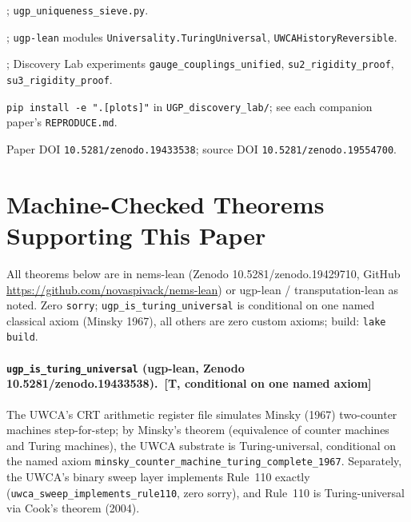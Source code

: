 \documentclass[12pt]{article}
\begin{document}
\begin{description}[leftmargin=0pt,itemsep=0.3em]
\item[\textit{AP-I (Uniqueness):}] \cite{SpivackUGPUniqueness}; \texttt{ugp\_uniqueness\_sieve.py}.
\item[\textit{AP-III (Reflexive Computation):}] \cite{SpivackUGPFormalization,ugp-lean}; \texttt{ugp-lean} modules \texttt{Universality.\allowbreak TuringUniversal}, \texttt{UWCAHistoryReversible}.
\item[\textit{AP-IV (Constants):}] \cite{Spivack2025_UGPMathFoundations}; Discovery Lab experiments \texttt{gauge\_couplings\_unified}, \texttt{su2\_rigidity\_proof}, \texttt{su3\_rigidity\_proof}.
\item[\textit{All experiments:}] \texttt{pip install -e ".[plots]"} in \texttt{UGP\_discovery\_lab/}; see each companion paper's \texttt{REPRODUCE.md}.
\item[\textit{ugp-lean:}] Paper DOI \texttt{10.5281/zenodo.19433538}; source DOI \texttt{10.5281/zenodo.19554700}.
\end{description}

\section{Machine-Checked Theorems Supporting This Paper}
\label{app:lean}

All theorems below are in nems-lean (Zenodo 10.5281/\allowbreak zenodo.19429710,
GitHub \url{https://github.com/novaspivack/nems-lean}) or ugp-lean / transputation-lean
as noted. Zero \texttt{sorry}; \texttt{ugp\_is\_turing\_universal} is conditional on one
named classical axiom (Minsky 1967), all others are zero custom axioms; build:
\texttt{lake build}.

\paragraph{\texttt{ugp\_is\_turing\_universal} (ugp-lean,
Zenodo 10.5281/\allowbreak zenodo.19433538).~[\textbf{T}, conditional on one named axiom]}
The UWCA's CRT arithmetic register file simulates Minsky (1967) two-counter machines
step-for-step; by Minsky's theorem (equivalence of counter machines and Turing
machines), the UWCA substrate is Turing-universal, conditional on the named axiom
\texttt{minsky\_counter\_machine\_turing\_complete\_1967}. Separately, the UWCA's binary
sweep layer implements Rule~110 exactly (\texttt{uwca\_sweep\_implements\_rule110}, zero
sorry), and Rule~110 is Turing-universal via Cook's theorem (2004).
\end{document}
